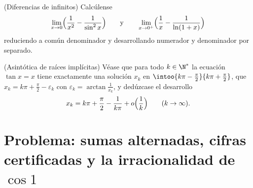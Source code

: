 \begin{exercise}[$\star\star$]\label{exo:b1:taylor:11}
(Diferencias de infinitos) Calcúlense
\[
\lim_{x \to 0} \Bigl(\frac{1}{x^2} - \frac{1}{\sin^2 x}\Bigr)
\qquad\text{y}\qquad
\lim_{x \to 0^+} \Bigl(\frac 1x - \frac{1}{\ln(1 + x)}\Bigr)
\]
reduciendo a común denominador y desarrollando numerador y
denominador por separado.
\end{exercise}

\begin{exercise}[$\star\star\star$]\label{exo:b1:taylor:12}
(Asintótica de raíces implícitas) Véase que para todo $k \in \N^*$ la
ecuación $\tan x = x$ tiene exactamente una solución $x_k$ en
$\intoo{k\pi - \frac\pi2}{k\pi + \frac\pi2}$, que
$x_k = k\pi + \frac\pi2 - \varepsilon_k$ con
$\varepsilon_k = \arctan\frac{1}{x_k}$, y dedúzcase el desarrollo
\[
x_k = k\pi + \frac\pi2 - \frac{1}{k\pi} + o\Bigl(\frac
1k\Bigr) \qquad (k \to \infty).
\]
\end{exercise}

\section{Problema: sumas alternadas, cifras certificadas y la
irracionalidad de $\cos 1$}


